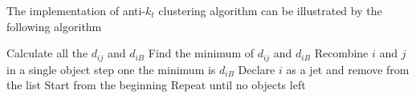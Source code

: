 %
%
%
%
%


The implementation of anti-$k_t$ clustering algorithm can be illustrated by the following algorithm
\begin{algorithmic}
\State Calculate all the $d_{ij}$ and $d_{iB}$
\State Find the minimum of $d_{ij}$ and $d_{iB}$ 
	\State Recombine $i$ and $j$ in a single object 
	\State \Return step one
\Else \State the minimum is $d_{iB}$
	\State Declare $i$ as a jet and remove from the list
	\State Start from the beginning	
\EndIf
\State Repeat until no objects left 
\end{algorithmic}

